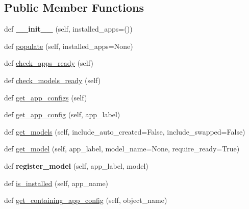\subsection*{Public Member Functions}
\begin{DoxyCompactItemize}
\item 
\mbox{\label{classdjango_1_1apps_1_1registry_1_1_apps_aede3b55c19eca7a398f1c846aaede721}} 
def {\bfseries \+\_\+\+\_\+init\+\_\+\+\_\+} (self, installed\+\_\+apps=())
\item 
def \mbox{\hyperlink{classdjango_1_1apps_1_1registry_1_1_apps_a32d20690174973f17f6f90411fdc66f7}{populate}} (self, installed\+\_\+apps=None)
\item 
def \mbox{\hyperlink{classdjango_1_1apps_1_1registry_1_1_apps_ad6fb1dd4c6fe9a6eda870a8bd40637fe}{check\+\_\+apps\+\_\+ready}} (self)
\item 
def \mbox{\hyperlink{classdjango_1_1apps_1_1registry_1_1_apps_aecc29621c2c6ba865571c4a80f8ae16b}{check\+\_\+models\+\_\+ready}} (self)
\item 
def \mbox{\hyperlink{classdjango_1_1apps_1_1registry_1_1_apps_a61d77b3e6418c9a0f4a275a02dc6ea77}{get\+\_\+app\+\_\+configs}} (self)
\item 
def \mbox{\hyperlink{classdjango_1_1apps_1_1registry_1_1_apps_a6af9ec3ee6ad673c5e8ddc8c5fae6665}{get\+\_\+app\+\_\+config}} (self, app\+\_\+label)
\item 
def \mbox{\hyperlink{classdjango_1_1apps_1_1registry_1_1_apps_a13f52d8f06f92f62a872ac72369046d8}{get\+\_\+models}} (self, include\+\_\+auto\+\_\+created=False, include\+\_\+swapped=False)
\item 
def \mbox{\hyperlink{classdjango_1_1apps_1_1registry_1_1_apps_a1722738559e3037cf8a08593373b8722}{get\+\_\+model}} (self, app\+\_\+label, model\+\_\+name=None, require\+\_\+ready=True)
\item 
\mbox{\label{classdjango_1_1apps_1_1registry_1_1_apps_a3a940b0f28159f896efc6d2ee0053e21}} 
def {\bfseries register\+\_\+model} (self, app\+\_\+label, model)
\item 
def \mbox{\hyperlink{classdjango_1_1apps_1_1registry_1_1_apps_a3d207aa9742b3a6c90daff158a86bcdb}{is\+\_\+installed}} (self, app\+\_\+name)
\item 
def \mbox{\hyperlink{classdjango_1_1apps_1_1registry_1_1_apps_a6bf08657a76fffc35ac36397c5bf8b52}{get\+\_\+containing\+\_\+app\+\_\+config}} (self, object\+\_\+name)

\end{DoxyCompactItemize}
